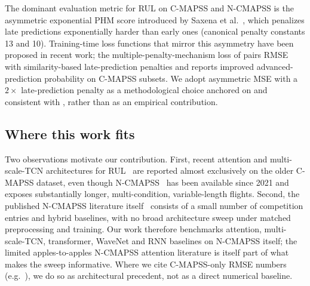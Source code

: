The dominant evaluation metric for RUL on C-MAPSS and N-CMAPSS is the asymmetric exponential PHM score introduced by Saxena et al.~\cite{saxena2008damage}, which penalizes late predictions exponentially harder than early ones (canonical penalty constants 13 and 10). Training-time loss functions that mirror this asymmetry have been proposed in recent work; the multiple-penalty-mechanism loss of \cite{mpm2024loss} pairs RMSE with similarity-based late-prediction penalties and reports improved advanced-prediction probability on C-MAPSS subsets. We adopt asymmetric MSE with a $2\times$ late-prediction penalty as a methodological choice anchored on \cite{saxena2008damage} and consistent with \cite{mpm2024loss}, rather than as an empirical contribution.

\subsection{Where this work fits}

Two observations motivate our contribution. First, recent attention and multi-scale-TCN architectures for RUL~\cite{fan2024star,ttsnet2025,xu2024msattn} are reported almost exclusively on the older C-MAPSS dataset, even though N-CMAPSS~\cite{ariaschao2021ncmapss} has been available since 2021 and exposes substantially longer, multi-condition, variable-length flights. Second, the published N-CMAPSS literature itself~\cite{lovberg2021variable,devol2021inception,solismartin2021stacked,ncmapss_eventual2023,ariaschao2022fusing} consists of a small number of competition entries and hybrid baselines, with no broad architecture sweep under matched preprocessing and training. Our work therefore benchmarks attention, multi-scale-TCN, transformer, WaveNet and RNN baselines on N-CMAPSS itself; the limited apples-to-apples N-CMAPSS attention literature is itself part of what makes the sweep informative. Where we cite C-MAPSS-only RMSE numbers (e.g.\ \cite{fan2024star,ttsnet2025,xu2024msattn}), we do so as architectural precedent, not as a direct numerical baseline.
